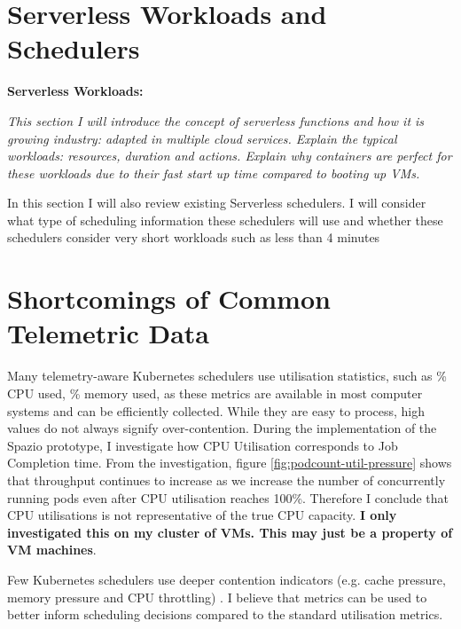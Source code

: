 \section{Serverless Workloads and Schedulers}
\begin{tcolorbox}[boxsep=0mm,left=2.5mm,right=2.5mm] \textbf{Serverless
    Workloads:} {\em This section I will introduce the concept of serverless
    functions and how it is growing industry: adapted in multiple cloud
    services. Explain the typical workloads: resources, duration and actions.
Explain why containers are perfect for these workloads due to their fast start
up time compared to booting up VMs.

In this section I will also review existing
    Serverless schedulers. I will consider what type of scheduling information
    these schedulers will use and whether these schedulers consider very short
    workloads such as less than 4 minutes
}  \end{tcolorbox}

\section{Shortcomings of Common Telemetric Data}

Many telemetry-aware Kubernetes schedulers \cite{trimaran,
netto_koordinator_2018, gog_firmament_2016, poseidon} use utilisation
statistics, such as \% CPU used, \% memory used, as these metrics are available
in most computer systems and can be efficiently collected. While they are easy
to process, high values do not always signify over-contention. During the
implementation of the Spazio prototype, I investigate how CPU Utilisation
corresponds to Job Completion time. From the investigation, figure
\ref{fig:podcount-util-pressure} shows that throughput continues to increase as
we increase the number of concurrently running pods even after CPU utilisation
reaches 100\%. Therefore I conclude that CPU utilisations is not representative
of the true CPU capacity. \textbf{I only investigated this on my cluster of
VMs. This may just be a property of VM machines}.

Few Kubernetes schedulers use deeper contention indicators (e.g. cache pressure,
memory pressure and CPU throttling) \cite{intel-tas, netto_koordinator_2018}. I believe
that metrics can be used to better inform scheduling decisions compared to the
standard utilisation metrics.

